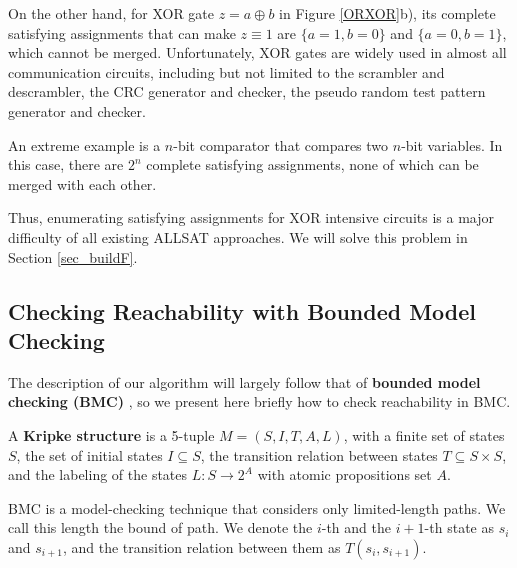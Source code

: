 \documentclass[journal]{IEEEtran}
\begin{document}
On the other hand,
for XOR gate $z= a \oplus b$ in Figure \ref{ORXOR}b),
its complete satisfying assignments that can make $z\equiv 1$ are $\{a= 1, b= 0\}$ and $\{a= 0, b= 1\}$,
which cannot be merged.
Unfortunately, XOR gates are widely used in almost all communication circuits,
including but not limited to the scrambler and descrambler,
the CRC generator and checker,
the pseudo random test pattern generator and checker.

An extreme example is a $n$-bit comparator that compares two $n$-bit variables.
In this case,
there are $2^n$ complete satisfying assignments,
none of which can be merged with each other.

Thus, enumerating satisfying assignments for XOR intensive circuits is a major difficulty of all existing ALLSAT approaches.
We will solve this problem in Section \ref{sec_buildF}.



\subsection{Checking Reachability with Bounded Model Checking}\label{subsec_bmc}

The description of our algorithm will largely follow that of \textbf{bounded model checking (BMC)} \cite{SMCSAT},
so we present here briefly how to check reachability in BMC.

\vspace{0.2cm}

\begin{definition11}\label{KripkeStructure}
A \textbf{Kripke structure} is a 5-tuple $M=(S,I,T,A,L)$, with a finite set of states $S$,
the set of initial states $I\subseteq S$,
the transition relation between states $T\subseteq S\times S$,
and the labeling of the states $L:S\rightarrow 2^{A}$ with atomic propositions set $A$.
\end{definition11}

\vspace{0.2cm}

BMC is a model-checking technique that considers only limited-length paths.
We call this length the bound of path.
We denote the $i$-th and the $i+1$-th state as $s_i$ and $s_{i+1}$,
and the transition relation between them as $T(s_i,s_{i+1})$.
\end{document}
